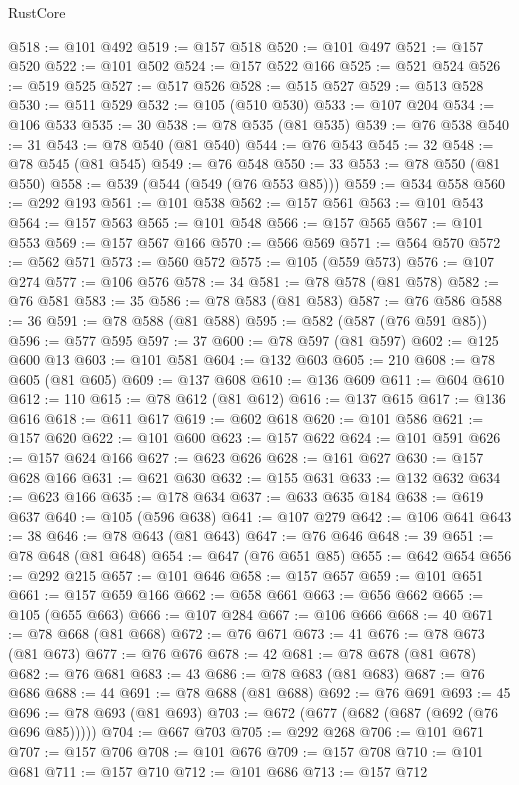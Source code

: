 \begin{lexlean}{RustCore}
\begin{coremodule}
@518 := @101 @492
@519 := @157 @518
@520 := @101 @497
@521 := @157 @520
@522 := @101 @502
@524 := @157 @522 @166
@525 := @521 @524
@526 := @519 @525
@527 := @517 @526
@528 := @515 @527
@529 := @513 @528
@530 := @511 @529
@532 := @105 (@510 @530)
@533 := @107 @204
@534 := @106 @533
@535 := 30
@538 := @78 @535 (@81 @535)
@539 := @76 @538
@540 := 31
@543 := @78 @540 (@81 @540)
@544 := @76 @543
@545 := 32
@548 := @78 @545 (@81 @545)
@549 := @76 @548
@550 := 33
@553 := @78 @550 (@81 @550)
@558 := @539 (@544 (@549 (@76 @553 @85)))
@559 := @534 @558
@560 := @292 @193
@561 := @101 @538
@562 := @157 @561
@563 := @101 @543
@564 := @157 @563
@565 := @101 @548
@566 := @157 @565
@567 := @101 @553
@569 := @157 @567 @166
@570 := @566 @569
@571 := @564 @570
@572 := @562 @571
@573 := @560 @572
@575 := @105 (@559 @573)
@576 := @107 @274
@577 := @106 @576
@578 := 34
@581 := @78 @578 (@81 @578)
@582 := @76 @581
@583 := 35
@586 := @78 @583 (@81 @583)
@587 := @76 @586
@588 := 36
@591 := @78 @588 (@81 @588)
@595 := @582 (@587 (@76 @591 @85))
@596 := @577 @595
@597 := 37
@600 := @78 @597 (@81 @597)
@602 := @125 @600 @13
@603 := @101 @581
@604 := @132 @603
@605 := 210
@608 := @78 @605 (@81 @605)
@609 := @137 @608
@610 := @136 @609
@611 := @604 @610
@612 := 110
@615 := @78 @612 (@81 @612)
@616 := @137 @615
@617 := @136 @616
@618 := @611 @617
@619 := @602 @618
@620 := @101 @586
@621 := @157 @620
@622 := @101 @600
@623 := @157 @622
@624 := @101 @591
@626 := @157 @624 @166
@627 := @623 @626
@628 := @161 @627
@630 := @157 @628 @166
@631 := @621 @630
@632 := @155 @631
@633 := @132 @632
@634 := @623 @166
@635 := @178 @634
@637 := @633 @635 @184
@638 := @619 @637
@640 := @105 (@596 @638)
@641 := @107 @279
@642 := @106 @641
@643 := 38
@646 := @78 @643 (@81 @643)
@647 := @76 @646
@648 := 39
@651 := @78 @648 (@81 @648)
@654 := @647 (@76 @651 @85)
@655 := @642 @654
@656 := @292 @215
@657 := @101 @646
@658 := @157 @657
@659 := @101 @651
@661 := @157 @659 @166
@662 := @658 @661
@663 := @656 @662
@665 := @105 (@655 @663)
@666 := @107 @284
@667 := @106 @666
@668 := 40
@671 := @78 @668 (@81 @668)
@672 := @76 @671
@673 := 41
@676 := @78 @673 (@81 @673)
@677 := @76 @676
@678 := 42
@681 := @78 @678 (@81 @678)
@682 := @76 @681
@683 := 43
@686 := @78 @683 (@81 @683)
@687 := @76 @686
@688 := 44
@691 := @78 @688 (@81 @688)
@692 := @76 @691
@693 := 45
@696 := @78 @693 (@81 @693)
@703 := @672 (@677 (@682 (@687 (@692 (@76 @696 @85)))))
@704 := @667 @703
@705 := @292 @268
@706 := @101 @671
@707 := @157 @706
@708 := @101 @676
@709 := @157 @708
@710 := @101 @681
@711 := @157 @710
@712 := @101 @686
@713 := @157 @712

\end{coremodule}
\end{lexlean}
